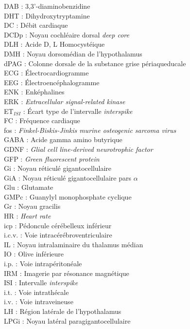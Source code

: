 \documentclass[a4paper,12pt,twoside]{report}
\begin{document}
\begin{singlespacing}
\begin{multicols}{2}
DAB : 3,3’-diaminobenzidine\\
DHT : Dihydroxytryptamine\\
DC : Débit cardiaque\\
DCDp : Noyau cochléaire dorsal \textit{deep core}\\
DLH : Acide D, L Homocystéique\\
DMH : Noyau dorsomédian de l’hypothalamus\\
dPAG : Colonne dorsale de la substance grise périaqueducale\\
ECG : \' Electrocardiogramme\\
EEG : \' Electroencéphalogramme\\
ENK : Enképhalines\\
ERK : \textit{Extracellular signal-related kinase}\\
ET$_{ISI}$ : \' Ecart type de l’intervalle \textit{interspike}\\
FC : Fréquence cardiaque\\
fos : \textit{Finkel-Biskis-Jinkis murine osteogenic sarcoma virus}\\
GABA : Acide gamma amino butyrique\\
GDNF : \textit{Glial cell line-derived neurotrophic factor}\\
GFP : \textit{Green fluorescent protein}\\
Gi : Noyau réticulé gigantocellulaire\\
GiA : Noyau réticulé gigantocellulaire pars $\alpha$\\
Glu : Glutamate\\
GMPc : Guanylyl monophosphate cyclique\\
Gr : Noyau gracilis\\
HR : \textit{Heart rate}\\
icp : Pédoncule cérébelleux inférieur\\
i.c.v. : Voie intracérébroventriculaire\\
IL : Noyau intralaminaire du thalamus médian\\
IO : Olive inférieure\\
i.p. : Voie intrapéritonéale\\
IRM : Imagerie par résonance magnétique\\
ISI : Intervalle \textit{interspike}\\
i.t. : Voie intrathécale\\
i.v. : Voie intraveineuse\\
LH : Région latérale de l’hypothalamus\\
LPGi : Noyau latéral paragigantocellulaire\\

\end{multicols}
\end{singlespacing}
\end{document}
